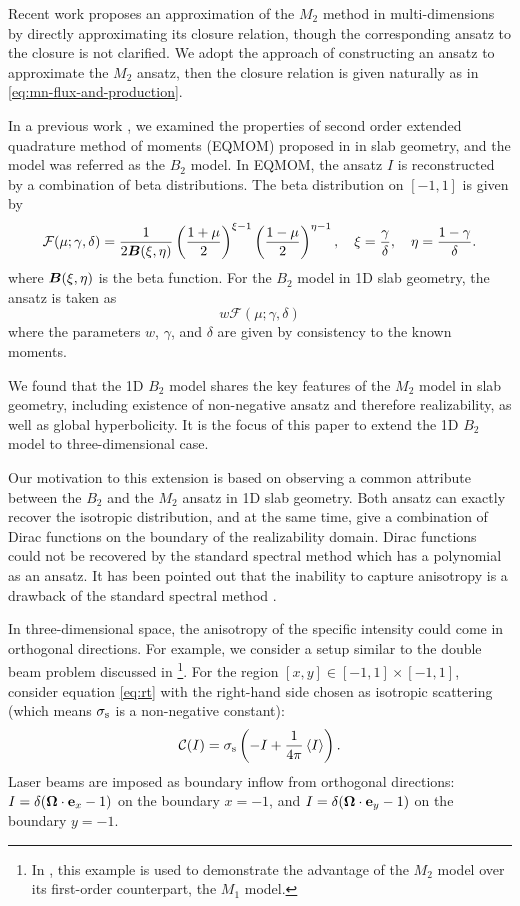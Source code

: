 Recent work \cite{pichard2016approximation} proposes an approximation
of the $M_2$ method in multi-dimensions by directly approximating its
closure relation, though the corresponding ansatz to the closure is
not clarified. We adopt the approach of constructing an ansatz to
approximate the $M_2$ ansatz, then the closure relation is given
naturally as in \eqref{eq:mn-flux-and-production}.

In a previous work \cite{alldredge2016approximating}, we examined the
properties of second order extended quadrature method of moments
(EQMOM) proposed in \cite{vikas2013radiation} in slab geometry, and
the model was referred as the $B_2$ model. In EQMOM, the ansatz
$\hat I$ is reconstructed by a combination of beta distributions. The
beta distribution on $[-1, 1]$ is given by
$$
\mathcal{F}(\mu; \gamma, \delta) = \frac1{2 \boldsymbol{B}(\xi, \eta)}
 \left(\frac{1 + \mu}2 \right)^{\xi - 1}
 \left(\frac{1 - \mu}2 \right)^{\eta-1},
\quad 
 \xi  = \frac\gamma\delta, \quad
 \eta = \frac{1 - \gamma}\delta.
$$
where $\boldsymbol{B}(\xi, \eta)$ is the beta function. For the $B_2$ model in
1D slab geometry, the ansatz is taken as
\[
w \mathcal{F}(\mu; \gamma, \delta)
\]
where the parameters $w$, $\gamma$, and $\delta$ are given by
consistency to the known moments.

We found that the 1D $B_2$ model shares the key features of the $M_2$
model in slab geometry, including existence of non-negative ansatz and
therefore realizability, as well as global hyperbolicity. It is the
focus of this paper to extend the 1D $B_2$ model to three-dimensional
case.

Our motivation to this extension is based on observing a common
attribute between the $B_2$ and the $M_2$ ansatz in 1D slab
geometry. Both ansatz can exactly recover the isotropic distribution,
and at the same time, give a combination of Dirac functions on the
boundary of the realizability domain. Dirac functions could not be
recovered by the standard spectral method which has a polynomial as an
ansatz. It has been pointed out that the inability to capture
anisotropy is a drawback of the standard spectral method
\cite{frank2006partial}.

In three-dimensional space, the anisotropy of the specific intensity
could come in orthogonal directions. For example, we consider a setup
similar to the double beam problem discussed in
\cite{pichard2016approximation} \footnote{ In
  \cite{pichard2016approximation}, this example is used to demonstrate
  the advantage of the $M_2$ model over its first-order counterpart,
  the $M_1$ model.  }.  For the region $[x,y]\in[-1,1]\times[-1,1]$,
consider equation \eqref{eq:rt} with the right-hand side chosen as
isotropic scattering (which means $\sigma_{\mathrm{s}}$ is a non-negative constant):
\[
  {\mathcal C}(I) = \sigma_{\mathrm{s}} \left( -I + \dfrac{1}{4\pi} \left\langle I \right\rangle 
  \right).
\]
Laser beams are imposed as boundary inflow from orthogonal 
directions: $I = \delta(\boldsymbol{\Omega}\cdot\mathbf{e}_x-1)$ on the 
boundary $x = -1$, and $I = \delta(\boldsymbol{\Omega}\cdot\mathbf{e}_y - 1)$
on the boundary $y = -1$. 


